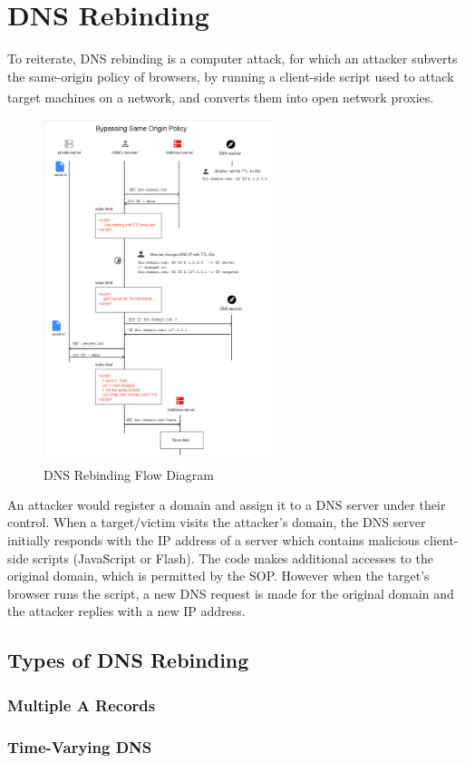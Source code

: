 \chapter{DNS Rebinding}

To reiterate, DNS rebinding is a computer attack, for which an attacker subverts
the same-origin policy of browsers, by running a client-side script used to
attack target machines on a network, and converts them into open network
proxies\textsuperscript{\cite{jackson2009protecting}}.

\vspace{0.5cm}

\begin{figure}[H]
\begin{center}
	\includegraphics[width=0.59\textwidth,keepaspectratio]{img/dnsrebindingflow.jpg}
	\caption{DNS Rebinding Flow Diagram\textsuperscript{\cite{vulnsec}}}
\end{center}
\end{figure}

\vspace{0.5cm}

An attacker would register a domain and assign it to a DNS server under their
control. When a target/victim visits the attacker's domain, the DNS server
initially responds with the IP address of a server which contains malicious
client-side scripts (JavaScript or Flash). The code makes additional accesses
to the original domain, which is permitted by the SOP. However when the
target's browser runs the script, a new DNS request is made for the original
domain and the attacker replies with a new IP address.

\section{Types of DNS Rebinding}

\subsection{Multiple A Records}

\subsection{Time-Varying DNS}
